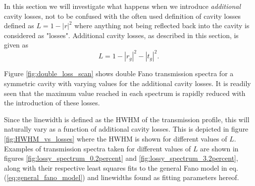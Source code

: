 In this section we will investigate what happens when we introduce \emph{additional} cavity losses, not to be confused with the often used definition of cavity losses defined as $L=1-|r|^2$ where anything not being reflected back into the cavity is considered as "losses". Additional cavity losses, as described in this section, is given as
\begin{equation}
    L = 1 - |r_g|^2 - |t_g|^2.
\end{equation}

Figure \ref{fig:double_loss_scan} shows double Fano transmission spectra for a symmetric cavity with varying values for the additional cavity losses. It is readily seen that the maximum value reached in each spectrum is rapidly reduced with the introduction of these losses. 

Since the linewidth is defined as the HWHM of the transmission profile, this will naturally vary as a function of additional cavity losses. This is depicted in figure \ref{fig:HWHM_vs_losses} where the HWHM is shown for different values of $L$. Examples of transmission spectra taken for different values of $L$ are shown in figures \ref{fig:lossy_spectrum_0.2percent} and \ref{fig:lossy_spectrum_3.2percent}, along with their respective least squares fits to the general Fano model in eq. (\ref{eq:general_fano_model}) and linewidths found as fitting parameters hereof. 

